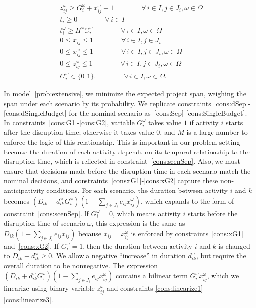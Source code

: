 \documentclass[11pt]{article}
\begin{document}
\begin{subequations}
\begin{align}
		& z_{ij}^\omega \geq G_i^\omega + x_{ij}^\omega - 1 \qquad \qquad \forall \,i \in I, j \in J_i, \omega \in \Omega \label{cons:linearize3}\\
		& t_i \geq 0 \qquad \qquad \forall \,i \in I \label{cons:nonnegt}\\
		& t_i^\omega \geq H^\omega G_i^\omega \qquad \qquad \forall\, i \in I, \omega \in \Omega \label{cons:extra} \\
		& 0 \leq x_{ij} \leq 1 \qquad \qquad \forall \,i \in I, j \in J_i\\ 
		& 0 \leq x_{ij}^\omega \leq 1 \qquad \qquad \forall \,i \in I, j \in J_i, \omega \in \Omega\\
		& 0 \leq z_{ij}^\omega \leq 1 \qquad \qquad \forall \,i \in I, j \in J_i, \omega \in \Omega\\
		& G_i^\omega \in \{0,1\}. \qquad \qquad \forall \,i \in I, \omega \in \Omega. \label{cons:Gbounds}
		\end{align}
	\end{subequations}
	
	In model~\eqref{prob:extensive}, we minimize the expected project span, weighing the span under each scenario by its probability. We replicate constraints~\eqref{cons:dSep}-\eqref{cons:dSingleBudget} for the nominal scenario as~\eqref{cons:Sep}-\eqref{cons:SingleBudget}. In constraints~\eqref{cons:G1}-\eqref{cons:G2}, variable \(G^\omega_i\) takes value \(1\) if activity \(i\) starts after the disruption time; otherwise it takes value 0, and \(M\) is a large number to enforce the logic of this relationship. This is important in our problem setting because the duration of each activity depends on its temporal relationship to the disruption time, which is reflected in constraint~\eqref{cons:scenSep}. Also, we must ensure that decisions made before the disruption time in each scenario match the nominal decisions, and constraints~\eqref{cons:tG1}-\eqref{cons:xG2} capture these non-anticipativity conditions. For each scenario, the duration between activity \(i\) and \(k\) becomes \((D_{ik} + d_{ik}^\omega G_i^\omega)(1 - \sum_{j \in J_i} e_{ij}x_{ij}^\omega)\), which expands to the form of constraint~\eqref{cons:scenSep}. If \(G_i^\omega = 0\), which means activity \(i\) starts before the disruption time of scenario \(\omega\), this expression is the same as \(D_{ik} (1 - \sum_{j \in J_i} e_{ij}x_{ij})\) because \(x_{ij} = x_{ij}^\omega\) is enforced by constraints~\eqref{cons:xG1} and~\eqref{cons:xG2}. If \(G_i^\omega = 1\), then the duration between activity \(i\) and \(k\) is changed to \(D_{ik} + d_{ik}^\omega \ge 0\). We allow a negative ``increase'' in duration $d_{ik}^\omega$, but require the overall duration to be nonnegative. The expression \((D_{ik} + d_{ik}^\omega G_i^\omega)(1 - \sum_{j \in J_i} e_{ij}x_{ij}^\omega)\) contains a bilinear term \(G_i^\omega x_{ij}^\omega\), which we linearize using binary variable \(z_{ij}^\omega\) and constraints \eqref{cons:linearize1}-\eqref{cons:linearize3}.
	
\end{document}
